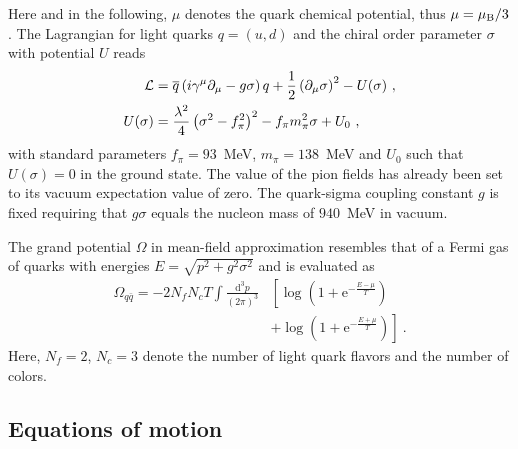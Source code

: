 \documentclass[%
 reprint,
 amsmath,amssymb,
 aps,
]{revtex4-2}
\begin{document}
Here and in the following, $\mu$ denotes the quark chemical potential, thus $\mu=\mu_{\rm B}/3$. The Lagrangian for light quarks $q=(u,d)$ and the chiral order parameter $\sigma$ with potential $U$ reads
\begin{align}
\label{eq:Lagrangian}
 {\cal L}&=\overline{q}\left(i \gamma^\mu \partial_\mu-g \sigma\right)q + \frac{1}{2}\left(\partial_\mu\sigma\right)^2- U(\sigma)~, \\
 U(\sigma)&=\frac{\lambda^2}{4}\left(\sigma^2-f_{\pi}^2\right)^2-f_{\pi}m_{\pi}^2\sigma +U_0~,    
\end{align}
with standard parameters $f_\pi=93$~MeV, $m_\pi=138$~MeV and $U_0$ such that $U(\sigma)=0$ in the ground state. The value of the pion fields has already been set to its vacuum expectation value of zero. The quark-sigma coupling constant $g$ is fixed requiring that $g\sigma$ equals the nucleon mass of $940$~MeV in vacuum. 

The grand potential $\Omega$ in mean-field approximation resembles that of a Fermi gas of quarks with energies $E=\sqrt{p^2+g^2\sigma^2}$ and is evaluated as
\begin{align}
 \Omega_{q\bar q}=-2N_f N_c T\int \frac{\mathrm d^3 p}{(2\pi)^3} & \left[\log\left(1+\mathrm e^{-\frac{E-\mu}{T}}\right)\right. \\ & \left. +\log\left(1+\mathrm e^{-\frac{E+\mu}{T}}\right)\right]~.
\end{align}
Here, $N_f=2$, $N_c=3$ denote the number of light quark flavors and the number of colors.


\subsection{Equations of motion}
\end{document}
